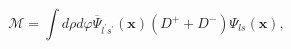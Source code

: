 \begin{equation}
\mathcal{M=}\int d\rho d\varphi \overline{\Psi }_{l^{\prime }s^{\prime }}(%
\mathbf{x})\left( D^{+}+D^{-}\right) \Psi _{ls}(\mathbf{x}),
\label{eq36}
\end{equation}

